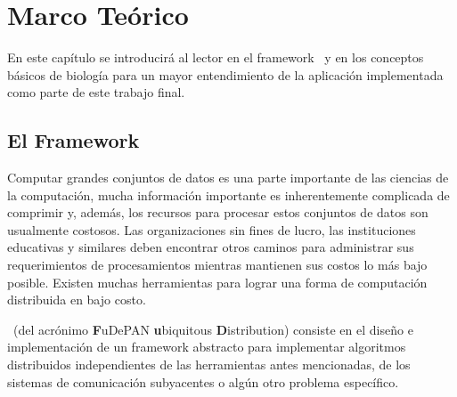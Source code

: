 \chapter{Marco Te\'orico}
  En este cap\'itulo se introducir\'a al lector en el framework \fud \ y en los conceptos b\'asicos de biolog\'ia para un mayor entendimiento de la
  aplicaci\'on implementada como parte de este trabajo final.

  \section{El Framework \fud}
    Computar grandes conjuntos de datos es una parte importante de las ciencias de la computaci\'on, mucha informaci\'on importante es inherentemente
    complicada de comprimir y, adem\'as, los recursos para procesar estos conjuntos de datos son usualmente costosos. Las organizaciones sin fines de
    lucro, las instituciones educativas y similares deben encontrar otros caminos para administrar sus requerimientos de procesamientos mientras
    mantienen sus costos lo m\'as bajo posible. Existen muchas herramientas para lograr una forma de computaci\'on distribuida en bajo costo.

    \fud \ (del acr\'onimo \textbf{F}uDePAN \textbf{u}biquitous \textbf{D}istribution) consiste en el dise\~no e implementaci\'on de un framework
    abstracto para implementar algoritmos distribuidos independientes de las herramientas antes mencionadas, de los sistemas de comunicaci\'on 
    subyacentes o alg\'un otro problema espec\'ifico.

